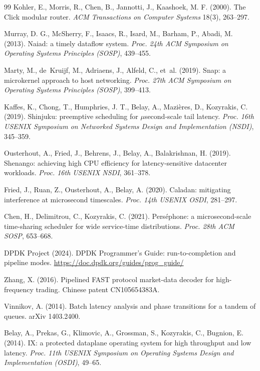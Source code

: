 \documentclass[11pt]{article}
\begin{document}
\begin{thebibliography}{99}
Kohler, E., Morris, R., Chen, B., Jannotti, J., Kaashoek, M. F. (2000). The Click modular
router. \textit{ACM Transactions on Computer Systems} 18(3), 263--297.

Murray, D. G., McSherry, F., Isaacs, R., Isard, M., Barham, P., Abadi, M. (2013). Naiad: a
timely dataflow system. \textit{Proc. 24th ACM Symposium on Operating Systems Principles
(SOSP)}, 439--455.

Marty, M., de~Kruijf, M., Adriaens, J., Alfeld, C., et~al. (2019). Snap: a microkernel
approach to host networking. \textit{Proc. 27th ACM Symposium on Operating Systems
Principles (SOSP)}, 399--413.

Kaffes, K., Chong, T., Humphries, J. T., Belay, A., Mazi\`eres, D., Kozyrakis, C. (2019).
Shinjuku: preemptive scheduling for $\mu$second-scale tail latency. \textit{Proc. 16th
USENIX Symposium on Networked Systems Design and Implementation (NSDI)}, 345--359.

Ousterhout, A., Fried, J., Behrens, J., Belay, A., Balakrishnan, H. (2019). Shenango:
achieving high CPU efficiency for latency-sensitive datacenter workloads. \textit{Proc.
16th USENIX NSDI}, 361--378.

Fried, J., Ruan, Z., Ousterhout, A., Belay, A. (2020). Caladan: mitigating interference at
microsecond timescales. \textit{Proc. 14th USENIX OSDI}, 281--297.

Chen, H., Delimitrou, C., Kozyrakis, C. (2021). Pers\'ephone: a microsecond-scale
time-sharing scheduler for wide service-time distributions. \textit{Proc. 28th ACM SOSP},
653--668.

DPDK Project (2024). DPDK Programmer's Guide: run-to-completion and pipeline modes.
\url{https://doc.dpdk.org/guides/prog_guide/}

Zhang, X. (2016). Pipelined FAST protocol market-data decoder for high-frequency trading.
Chinese patent CN105654383A.

Vinnikov, A. (2014). Batch latency analysis and phase transitions for a tandem of queues.
arXiv 1403.2400.

Belay, A., Prekas, G., Klimovic, A., Grossman, S., Kozyrakis, C., Bugnion, E. (2014). IX:
a protected dataplane operating system for high throughput and low latency. \textit{Proc.
11th USENIX Symposium on Operating Systems Design and Implementation (OSDI)}, 49--65.

\end{thebibliography}
\end{document}
